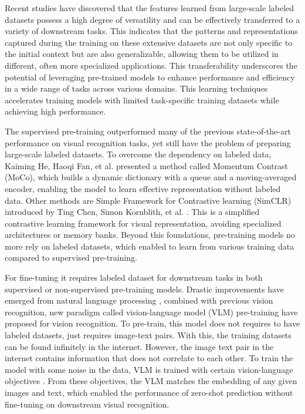 Recent studies \cite{radford2021learning} have discovered that the features learned from large-scale labeled datasets possess a high degree of versatility and can be effectively transferred to a variety of downstream tasks. This indicates that the patterns and representations captured during the training on these extensive datasets are not only specific to the initial context but are also generalizable, allowing them to be utilized in different, often more specialized applications. This transferability underscores the potential of leveraging pre-trained models to enhance performance and efficiency in a wide range of tasks across various domains. 
This learning techniques accelerates training models with limited task-specific training datasets while achieving high performance.

The supervised pre-training outperformed many of the previous state-of-the-art performance on visual recognition tasks, yet still have the problem of preparing large-scale labeled datasets. To overcome the dependency on labeled data, Kaiming He, Haoqi Fan, et al.\cite{he2020momentumcontrastunsupervisedvisual} presented a method called Momentum Contrast (MoCo), which builds a dynamic dictionary with a queue and a moving-averaged encoder, enabling the model to learn effective representation without labeled data. Other methods are Simple Framework for Contrastive learning (SimCLR) introduced by Ting Chen, Simon Kornblith, et al. \cite{chen2020simpleframeworkcontrastivelearning}. This is a simplified contrastive learning framework for visual representation, avoiding specialized architectures or memory banks. 
Beyond this foundations, pre-training models no more rely on labeled datasets, which enabled to learn from various training data compared to supervised pre-training. 

For fine-tuning it requires labeled dataset for downstream tasks in both supervised or non-supervised pre-training models. Drastic improvements have emerged from natural language processing \cite{devlin2018bert}\cite{brown2020language}, combined with previous vision recognition, new paradigm called vision-language model (VLM) pre-training have proposed for vision recognition. To pre-train, this model does not requires to have labeled datasets, just requires image-text pairs. With this, the training datasets can be found infinitely in the internet. However, the image text pair in the internet contains information that does not correlate to each other. To train the model with some noise in the data, VLM is trained with certain vision-language objectives \cite{radford2021learning} \cite{yu2022cocacontrastivecaptionersimagetext}. From these objectives, the VLM 
matches the embedding of any given images and text, which enabled the performance of zero-shot prediction without fine-tuning on downstream visual recognition.


